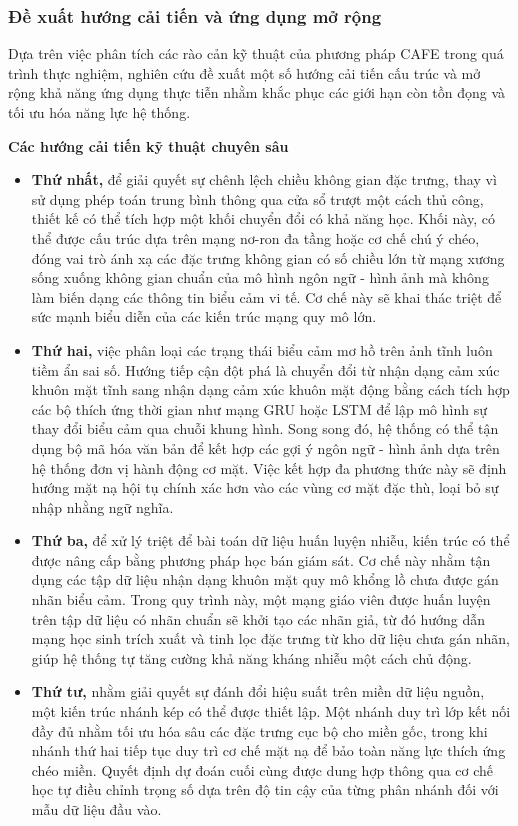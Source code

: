 \subsubsection{Đề xuất hướng cải tiến và ứng dụng mở rộng}

Dựa trên việc phân tích các rào cản kỹ thuật của phương pháp CAFE trong quá trình thực nghiệm, nghiên cứu đề xuất một số hướng cải tiến cấu trúc và mở rộng khả năng ứng dụng thực tiễn nhằm khắc phục các giới hạn còn tồn đọng và tối ưu hóa năng lực hệ thống.

\vspace{0.5em}
\noindent\textbf{Các hướng cải tiến kỹ thuật chuyên sâu}

\begin{itemize}
    \item \textbf{Thứ nhất,} để giải quyết sự chênh lệch chiều không gian đặc trưng, thay vì sử dụng phép toán trung bình thông qua cửa sổ trượt một cách thủ công, thiết kế có thể tích hợp một khối chuyển đổi có khả năng học. Khối này, có thể được cấu trúc dựa trên mạng nơ-ron đa tầng hoặc cơ chế chú ý chéo, đóng vai trò ánh xạ các đặc trưng không gian có số chiều lớn từ mạng xương sống xuống không gian chuẩn của mô hình ngôn ngữ - hình ảnh mà không làm biến dạng các thông tin biểu cảm vi tế. Cơ chế này sẽ khai thác triệt để sức mạnh biểu diễn của các kiến trúc mạng quy mô lớn.
    
    \item \textbf{Thứ hai,} việc phân loại các trạng thái biểu cảm mơ hồ trên ảnh tĩnh luôn tiềm ẩn sai số. Hướng tiếp cận đột phá là chuyển đổi từ nhận dạng cảm xúc khuôn mặt tĩnh sang nhận dạng cảm xúc khuôn mặt động bằng cách tích hợp các bộ thích ứng thời gian như mạng GRU hoặc LSTM để lập mô hình sự thay đổi biểu cảm qua chuỗi khung hình. Song song đó, hệ thống có thể tận dụng bộ mã hóa văn bản để kết hợp các gợi ý ngôn ngữ - hình ảnh dựa trên hệ thống đơn vị hành động cơ mặt. Việc kết hợp đa phương thức này sẽ định hướng mặt nạ hội tụ chính xác hơn vào các vùng cơ mặt đặc thù, loại bỏ sự nhập nhằng ngữ nghĩa.
    
    \item \textbf{Thứ ba,} để xử lý triệt để bài toán dữ liệu huấn luyện nhiễu, kiến trúc có thể được nâng cấp bằng phương pháp học bán giám sát. Cơ chế này nhằm tận dụng các tập dữ liệu nhận dạng khuôn mặt quy mô khổng lồ chưa được gán nhãn biểu cảm. Trong quy trình này, một mạng giáo viên được huấn luyện trên tập dữ liệu có nhãn chuẩn sẽ khởi tạo các nhãn giả, từ đó hướng dẫn mạng học sinh trích xuất và tinh lọc đặc trưng từ kho dữ liệu chưa gán nhãn, giúp hệ thống tự tăng cường khả năng kháng nhiễu một cách chủ động.
    
    \item \textbf{Thứ tư,} nhằm giải quyết sự đánh đổi hiệu suất trên miền dữ liệu nguồn, một kiến trúc nhánh kép có thể được thiết lập. Một nhánh duy trì lớp kết nối đầy đủ nhằm tối ưu hóa sâu các đặc trưng cục bộ cho miền gốc, trong khi nhánh thứ hai tiếp tục duy trì cơ chế mặt nạ để bảo toàn năng lực thích ứng chéo miền. Quyết định dự đoán cuối cùng được dung hợp thông qua cơ chế học tự điều chỉnh trọng số dựa trên độ tin cậy của từng phân nhánh đối với mẫu dữ liệu đầu vào.
\end{itemize}

